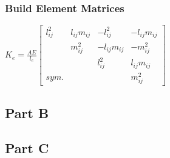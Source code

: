 \documentclass{article}
\begin{document}
\subsubsection*{Build Element Matrices}
$K_e=\frac{AE}{l_e}
\begin{bmatrix}
    l_{ij}^2 & l_{ij}m_{ij} & -l_{ij}^2 & -l_{ij}m_{ij} \\
    & m_{ij}^2 & -l_{ij}m_{ij} & -m_{ij}^2 \\
    & & l_{ij}^2 & l_{ij}m_{ij} \\
    sym. & & & m_{ij}^2
\end{bmatrix}$

\subsection*{Part B}

\subsection*{Part C}
\end{document}

